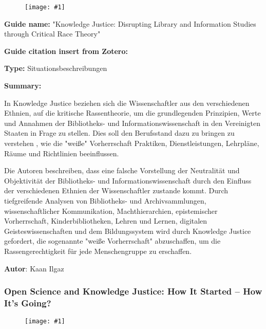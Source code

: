 \documentclass{article}
\newlength{\imgwidth}
\newcommand\scaledgraphics[2]{%
                
\settowidth{\imgwidth}{\texttt{[image: \#1]}}%
                
\setlength{\imgwidth}{\minof{\imgwidth}{#2\textwidth}}%
                
\texttt{[image: \#1]}%
                
}
\begin{document}
\begin{center}
\begin{figure}
\scaledgraphics{dcc1d35b-4186-4b50-a5a6-cf54422a8064.jpeg}{0.5}
\label{F29320001}
\end{figure}


\end{center}





\textbf{Guide name:} "Knowledge Justice: Disrupting Library and Information Studies through Critical Race Theory"


\textbf{Guide citation insert from Zotero:} \autocite{leung_knowledge_2021}


\textbf{Type:} Situationsbeschreibungen


\textbf{Summary:}

In Knowledge Justice beziehen sich die Wissenschaftler aus den verschiedenen Ethnien, auf die kritische Rassentheorie, um die grundlegenden Prinzipien, Werte und Annahmen der Bibliotheks- und Informationswissenschaft in den Vereinigten Staaten in Frage zu stellen. Dies soll den Berufsstand dazu zu bringen zu verstehen , wie die "weiße" Vorherrschaft Praktiken, Dienstleistungen, Lehrpläne, Räume und Richtlinien beeinflussen.


Die Autoren beschreiben, dass eine falsche Vorstellung der Neutralität und Objektivität der Bibliotheks- und Informationswissenschaft durch den Einfluss der verschiedenen Ethnien der Wissenschaftler zustande kommt. Durch tiefgreifende Analysen von Bibliotheks- und Archivsammlungen, wissenschaftlicher Kommunikation, Machthierarchien, epistemischer Vorherrschaft, Kinderbibliotheken, Lehren und Lernen, digitalen Geisteswissenschaften und dem Bildungssystem wird durch Knowledge Justice gefordert, die sogenannte "weiße Vorherrschaft" abzuschaffen, um die Rassengerechtigkeit für jede Menschengruppe zu erschaffen. 


\textbf{Autor}: Kaan Ilgaz


\subsubsection{Open Science and Knowledge Justice: How It Started – How It’s Going?}\label{H480694}


\begin{figure}
\scaledgraphics{e590694e-3a8f-4a2f-801f-704d7d8edbc0.png}{1}
\label{F3873651}
\end{figure}
\end{document}
